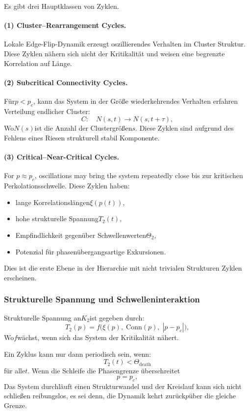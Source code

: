 Es gibt drei Hauptklassen von Zyklen.

\paragraph{(1) Cluster–Rearrangement Cycles.}
Lokale Edge-Flip-Dynamik erzeugt oszillierendes Verhalten im Cluster
Struktur.
Diese Zyklen nähern sich nicht der Kritikalität und weisen eine begrenzte Korrelation auf
Länge.

\paragraph{(2) Subcritical Connectivity Cycles.}
Für$p<p_c$, kann das System in der Größe wiederkehrendes Verhalten erfahren
Verteilung endlicher Cluster:
\[
  C: \quad
  N(s,t) \to N(s,t+\tau),
\]
Wo$N(s)$ist die Anzahl der Clustergrößen$s$.
Diese Zyklen sind aufgrund des Fehlens eines Riesen strukturell stabil
Komponente.

\paragraph{(3) Critical–Near-Critical Cycles.}
For $p\approx p_c$, oscillations may bring the system repeatedly close
bis zur kritischen Perkolationsschwelle.
Diese Zyklen haben:

\begin{itemize}
  \item lange Korrelationslängen$\xi(p(t))$,
  \item hohe strukturelle Spannung$T_2(t)$,
  \item Empfindlichkeit gegenüber Schwellenwerten$\Theta_2$,
  \item Potenzial für phasenübergangsartige Exkursionen.
\end{itemize}

Dies ist die erste Ebene in der Hierarchie mit nicht trivialen Strukturen
Zyklen erscheinen.

\subsubsection{Strukturelle Spannung und Schwelleninteraktion}

Strukturelle Spannung an$K_2$ist gegeben durch:
\[
T_2(p)
  = f\bigl(\xi(p),\; \mathrm{Conn}(p),\;
       |p - p_c|\bigr),
\]
Wo$f$wächst, wenn sich das System der Kritikalität nähert.

Ein Zyklus kann nur dann periodisch sein, wenn:
\[
  T_2(t) < \Theta_{\mathrm{death}}
\]
für alle$t$.
Wenn die Schleife die Phasengrenze überschreitet
\[
p = p_c,
\]
Das System durchläuft einen Strukturwandel und der Kreislauf kann sich nicht schließen
reibungslos, es sei denn, die Dynamik kehrt zurück$p$über die gleiche Grenze.

